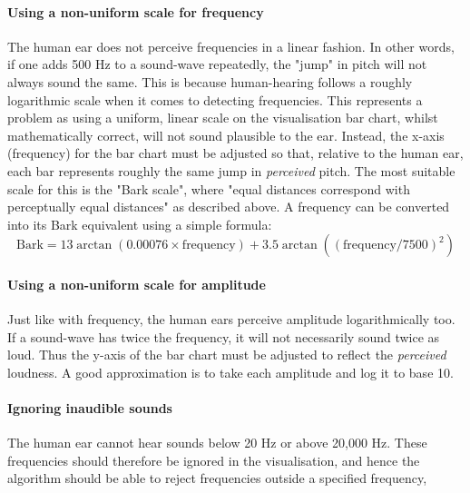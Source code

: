 \paragraph{Using a non-uniform scale for frequency}
The human ear does not perceive frequencies in a linear fashion. In other words, if one adds 500 Hz to a sound-wave repeatedly, the "jump" in pitch will not always sound the same.  This is because human-hearing follows a roughly logarithmic scale when it comes to detecting frequencies. This represents a problem as using a uniform, linear scale on the visualisation bar chart, whilst mathematically correct, will not sound plausible to the ear. Instead, the x-axis (frequency) for the bar chart must be adjusted so that, relative to the human ear, each bar represents roughly the same jump in \textit{perceived} pitch. The most suitable scale for this is the "Bark scale", where "equal distances correspond with perceptually equal distances" as described above. A frequency can be converted into its Bark equivalent using a simple formula:
\[
\text{Bark} = 13 \arctan(0.00076 \times \text{frequency}) + 3.5 \arctan ((\text{frequency} / 7500)^2)
\]

\paragraph{Using a non-uniform scale for amplitude}
Just like with frequency, the human ears perceive amplitude logarithmically too. If a sound-wave has twice the frequency, it will not necessarily sound twice as loud. Thus the y-axis of the bar chart must be adjusted to reflect the \textit{perceived} loudness. A good  approximation is to take each amplitude and log it to base 10.

\paragraph{Ignoring inaudible sounds}
The human ear cannot hear sounds below 20 Hz or above 20,000 Hz. These frequencies should therefore be ignored in the visualisation, and hence the algorithm should be able to reject frequencies outside a specified frequency,

